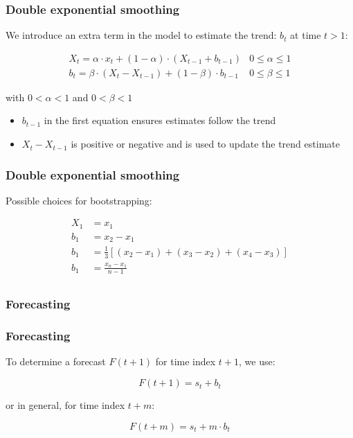 \documentclass{beamer}
\begin{document}
\begin{frame}
  \frametitle{Double exponential smoothing}
  
  We introduce an extra term in the model to estimate the trend: $b_t$ at time $t > 1$:

\begin{eqnarray}
  X_{t} = \alpha \cdot x_{t} + (1-\alpha) \cdot (X_{t-1} + b_{t-1}) & 0 \leq \alpha \leq 1 \\
  b_{t} = \beta \cdot (X_{t}-X_{t-1}) + (1-\beta) \cdot b_{t-1} & 0 \leq \beta \leq 1 
\label{eq:doubleSmoothing}
\end{eqnarray}

  with $0 < \alpha < 1$ and $0 < \beta < 1$
  
  \begin{itemize}
    \item $ b_{t-1}$ in the first equation ensures estimates follow the trend
    \item $X_{t}-X_{t-1}$ is positive or negative and is used to update the trend estimate
  \end{itemize}
\end{frame}

\begin{frame}
  \frametitle{Double exponential smoothing}
  
  Possible choices for bootstrapping:
  
\begin{align*}
  X_{1} & = x_{1} \\
  b_{1} & = x_{2} - x_{1} \\
  b_{1} & = \frac{1}{3}\left[ (x_{2} - x_{1}) + (x_{3} - x_{2}) + (x_{4} - x_{3}) \right]\\
  b_{1} & = \frac{x_{n} - x_{1}}{n-1} \\
\end{align*}

\end{frame}

\subsubsection{Forecasting}

\begin{frame}
  \frametitle{Forecasting}
  
  To determine a forecast $F(t+1)$ for time index $t+1$, we use:

  \[ F(t+1) = s_t + b_t \]

  or in general, for time index $t+m$:

  \[ F(t+m) = s_t + m \cdot b_t \]
\end{frame}
\end{document}
